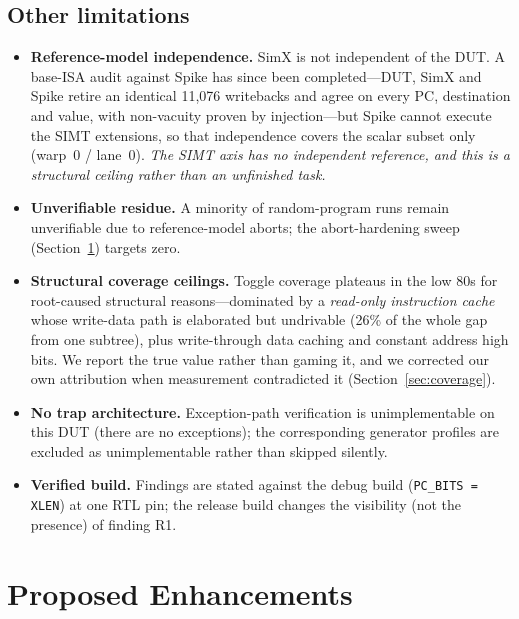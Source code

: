 \documentclass[conference]{IEEEtran}
\newcommand{\code}[1]{\texttt{\small #1}}
\begin{document}
\subsection{Other limitations}
\begin{itemize}
\item \textbf{Reference-model independence.} SimX is not independent of
the DUT. A base-ISA audit against Spike has since been completed---DUT,
SimX and Spike retire an identical 11{,}076 writebacks and agree on every
PC, destination and value, with non-vacuity proven by injection---but
Spike cannot execute the SIMT extensions, so that independence covers the
scalar subset only (warp~0 / lane~0). \emph{The SIMT axis has no
independent reference, and this is a structural ceiling rather than an
unfinished task.}
\item \textbf{Unverifiable residue.} A minority of random-program runs
remain unverifiable due to reference-model aborts; the abort-hardening
sweep (Section~\ref{sec:enhance}) targets zero.
\item \textbf{Structural coverage ceilings.} Toggle coverage plateaus in
the low 80s for root-caused structural reasons---dominated by a
\emph{read-only instruction cache} whose write-data path is elaborated
but undrivable (26\% of the whole gap from one subtree), plus
write-through data caching and constant address high bits. We report the
true value rather than gaming it, and we corrected our own attribution
when measurement contradicted it (Section~\ref{sec:coverage}).
\item \textbf{No trap architecture.} Exception-path verification is
unimplementable on this DUT (there are no exceptions); the
corresponding generator profiles are excluded as unimplementable
rather than skipped silently.
\item \textbf{Verified build.} Findings are stated against the debug
build (\code{PC\_BITS = XLEN}) at one RTL pin; the release build
changes the visibility (not the presence) of finding R1.
\end{itemize}

\section{Proposed Enhancements}
\label{sec:enhance}
\end{document}
